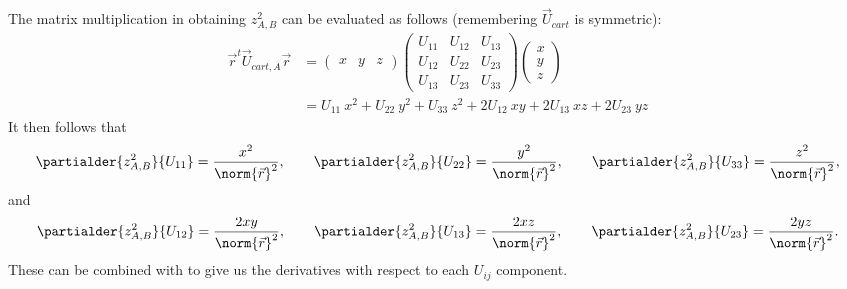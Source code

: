 \documentclass[11pt]{article}
\begin{document}
The matrix multiplication in obtaining $z^2_{A,B}$ can be evaluated as follows
(remembering $\vec{U}_{cart}$ is symmetric):
\begin{align}
\vec{r}^t\vec{U}_{cart,A}\vec{r} &= 
\begin{pmatrix} x & y & z \end{pmatrix}
\begin{pmatrix} U_{11} & U_{12} & U_{13}\\
  U_{12} & U_{22} & U_{23}\\
  U_{13} & U_{23} & U_{33}\end{pmatrix}
\begin{pmatrix} x\\y\\z\end{pmatrix}\\
&= U_{11}\: x^2 + U_{22}\: y^2 + U_{33}\: z^2 + 2U_{12}\: xy + 2U_{13}\: xz + 2U_{23}\: yz
\end{align}
It then follows that
\begin{equation}
\partialder{z^2_{A,B}}{U_{11}} = \frac{x^2}{\norm{\vec{r}}^2} ,\qquad
\partialder{z^2_{A,B}}{U_{22}} = \frac{y^2}{\norm{\vec{r}}^2} ,\qquad
\partialder{z^2_{A,B}}{U_{33}} = \frac{z^2}{\norm{\vec{r}}^2} ,
\end{equation}
and
\begin{equation}
\partialder{z^2_{A,B}}{U_{12}} = \frac{2xy}{\norm{\vec{r}}^2} ,\qquad
\partialder{z^2_{A,B}}{U_{13}} = \frac{2xz}{\norm{\vec{r}}^2} ,\qquad
\partialder{z^2_{A,B}}{U_{23}} = \frac{2yz}{\norm{\vec{r}}^2} .
\end{equation}
These can be combined with  to give us the derivatives
with respect to each $U_{ij}$ component.
\end{document}
